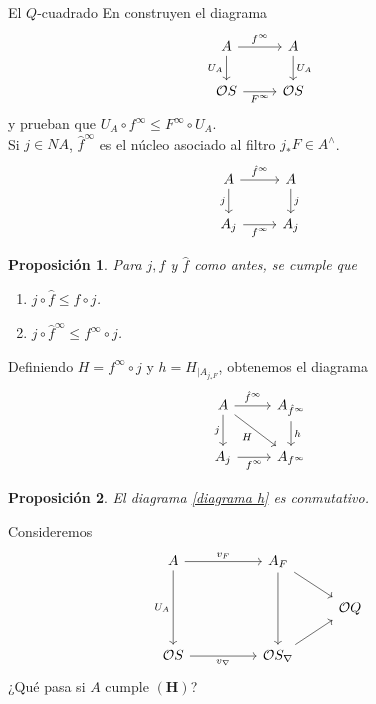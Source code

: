 \documentclass[compress,12pt]{beamer}
\newtheorem{prop}{Proposición}
\begin{document}
\begin{frame}[fragile]{El $Q$-cuadrado}
En \cite{H.S.V} construyen el diagrama
\[\begin{tikzcd}
	A & A \\
	{\mathcal{O}S} & {\mathcal{O}S}
	\arrow["{f^\infty}", from=1-1, to=1-2]
	\arrow["{U_A}"', from=1-1, to=2-1]
	\arrow["{U_A}", from=1-2, to=2-2]
	\arrow["{F^\infty}"', from=2-1, to=2-2]
\end{tikzcd}\]
y prueban que $U_A\circ f^\infty\leq F^\infty \circ U_A$.\\
	
Si $j\in NA$, $\hat{f}^\infty$ es el núcleo asociado al filtro $j_*F\in A^\wedge$.
\[\begin{tikzcd}
	A & A \\
	{A_j} & {A_j}
	\arrow["{\hat{f}^\infty}", from=1-1, to=1-2]
	\arrow["{j}"', from=1-1, to=2-1]
	\arrow["{j}", from=1-2, to=2-2]
	\arrow["{f^\infty}"', from=2-1, to=2-2]
\end{tikzcd}\]
\end{frame}

\begin{frame}[fragile]
\begin{prop}
Para $j, f$ y $\hat{f}$ como antes, se cumple que
\begin{enumerate}
\item $j\circ \hat{f}\leq f\circ j$.
\item $j\circ \hat{f}^\infty \leq f^\infty\circ j$.
\end{enumerate}
\end{prop}

Definiendo $H=f^\infty\circ j$ y $h=H_{\mid A_{j_*F}}$, obtenemos el diagrama
\begin{equation}\label{diagrama h}
	\begin{tikzcd}
	A & {A_{\hat{f}^\infty}} \\
	{A_j} & {A_{f^\infty}}
	\arrow["{\hat{f}^\infty}", from=1-1, to=1-2]
	\arrow["j"', from=1-1, to=2-1]
	\arrow["H"', from=1-1, to=2-2]
	\arrow["h", from=1-2, to=2-2]
	\arrow["{f^\infty}"', from=2-1, to=2-2]
\end{tikzcd}
\end{equation}

\begin{prop}
	El diagrama \eqref{diagrama h} es conmutativo.
\end{prop}
\end{frame}

\begin{frame}[fragile]
Consideremos 
\[\begin{tikzcd}
	A && {A_F} \\
	&&& {\mathcal{O}Q} \\
	{\mathcal{O}S} && {\mathcal{O}S_\nabla}
	\arrow["{v_F}", from=1-1, to=1-3]
	\arrow["{U_A}"', from=1-1, to=3-1]
	\arrow[from=1-3, to=2-4]
	\arrow[from=1-3, to=3-3]
	\arrow["{v_\nabla}"', from=3-1, to=3-3]
	\arrow[from=3-3, to=2-4]
\end{tikzcd}\]
¿Qué pasa si $A$ cumple $\mathbf{(H)}$?
\end{frame}
\end{document}
